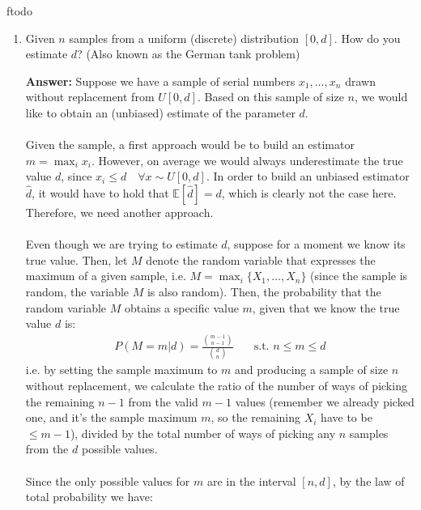 ƒtodo\documentclass{article}
\newenvironment{QandA}{\begin{enumerate}[label=\arabic*.]}{\end{enumerate}}
\newenvironment{answer}{\par\normalfont \textbf{Answer:}}{}
\newcommand{\Exp}[1]{\mathbb{E}\left[ #1 \right]}
\newcommand{\g}{\vert}
\begin{document}
\begin{QandA}
\begin{answer}
        (Read more \href{https://www.glassdoor.com/Interview/You-re-about-to-get-on-a-plane-to-Seattle-You-want-to-know-if-you-should-bring-an-umbrella-You-call-3-random-friends-of-y-QTN_519262.htm}{here})
    \end{answer}

    \item Given $n$ samples from a uniform (discrete) distribution $\left[0, d\right]$. How do you estimate $d$? (Also known as the German tank problem)
    \begin{answer}
        Suppose we have a sample of serial numbers $x_1, \ldots, x_n$ drawn without replacement from $U[0, d]$. Based on this sample of size $n$, we would like to obtain an (unbiased) estimate of the parameter $d$. \\\\
        Given the sample, a first approach would be to build an estimator $m = \max_i x_i$. However, on average we would always underestimate the true value $d$, since $x_i \le d \quad  \forall x \sim U[0, d]$. In order to build an unbiased estimator $\hat{d}$, it would have to hold that $\Exp{\hat{d}} = d$, which is clearly not the case here. Therefore, we need another approach. \\\\
        Even though we are trying to estimate $d$, suppose for a moment we know its true value. Then, let $M$ denote the random variable that expresses the maximum of a given sample, i.e. $M = \max_i \{X_1, \ldots, X_n\}$ (since the sample is random, the variable $M$ is also random). Then, the probability that the random variable $M$ obtains a specific value $m$, given that we know the true value $d$ is:
        \begin{align*}
            P(M = m \g d) = \frac{{ m-1 \choose n-1}}{{ d \choose n }} &\quad \text{s.t. } n \le m \le d
        \end{align*}
        i.e. by setting the sample maximum to $m$ and producing a sample of size $n$ without replacement, we calculate the ratio of the number of ways of picking the remaining $n-1$ from the valid $m-1$ values (remember we already picked one, and it's the sample maximum $m$, so the remaining $X_i$ have to be $\le m-1$), divided by the total number of ways of picking any $n$ samples from the $d$ possible values.\\\\
        Since the only possible values for $m$ are in the interval $[n, d]$, by the law of total probability we have:
        \begin{align*}

\end{align*}
\end{answer}
\end{QandA}
\end{document}
